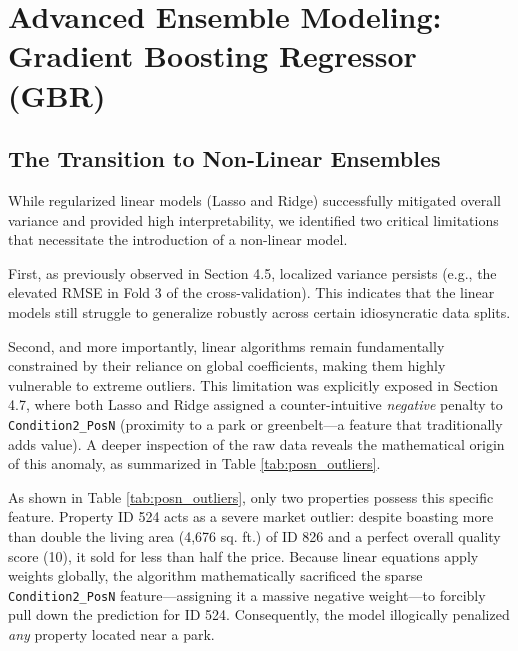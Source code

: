 \documentclass[11pt]{article}
\begin{document}
\section{Advanced Ensemble Modeling: Gradient Boosting Regressor (GBR)}

\subsection{The Transition to Non-Linear Ensembles}

While regularized linear models (Lasso and Ridge) successfully mitigated overall variance and provided high interpretability, we identified two critical limitations that necessitate the introduction of a non-linear model.

First, as previously observed in Section 4.5, localized variance persists (e.g., the elevated RMSE in Fold 3 of the cross-validation). This indicates that the linear models still struggle to generalize robustly across certain idiosyncratic data splits. 

Second, and more importantly, linear algorithms remain fundamentally constrained by their reliance on global coefficients, making them highly vulnerable to extreme outliers. This limitation was explicitly exposed in Section 4.7, where both Lasso and Ridge assigned a counter-intuitive \textit{negative} penalty to \texttt{Condition2\_PosN} (proximity to a park or greenbelt—a feature that traditionally adds value). A deeper inspection of the raw data reveals the mathematical origin of this anomaly, as summarized in Table \ref{tab:posn_outliers}.

\begin{table}[H]
\centering
{}
\caption{Raw data inspection of properties containing the sparse \texttt{Condition2\_PosN} feature.}
\label{tab:posn_outliers}
\end{table}

As shown in Table \ref{tab:posn_outliers}, only two properties possess this specific feature. Property ID 524 acts as a severe market outlier: despite boasting more than double the living area (4,676 sq. ft.) of ID 826 and a perfect overall quality score (10), it sold for less than half the price. Because linear equations apply weights globally, the algorithm mathematically sacrificed the sparse \texttt{Condition2\_PosN} feature—assigning it a massive negative weight—to forcibly pull down the prediction for ID 524. Consequently, the model illogically penalized \textit{any} property located near a park.
\end{document}
